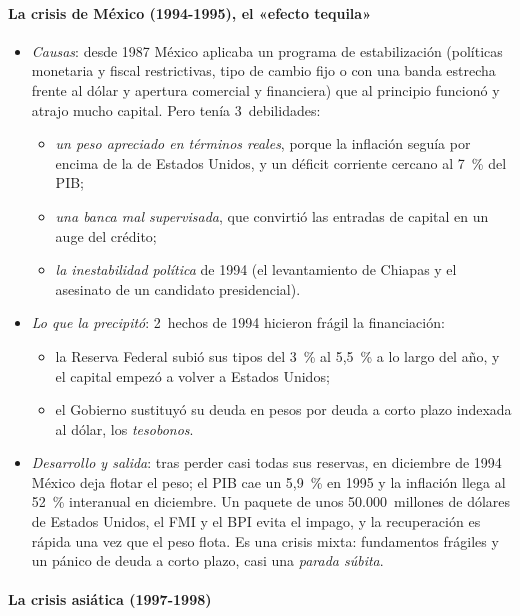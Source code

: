 \documentclass[11pt]{article}
\begin{document}
\paragraph{La crisis de México (1994-1995), el «efecto tequila»}

\begin{itemize}
\item \emph{Causas}: desde 1987 México aplicaba un programa de estabilización (políticas monetaria y fiscal restrictivas, tipo de cambio fijo o con una banda estrecha frente al dólar y apertura comercial y financiera) que al principio funcionó y atrajo mucho capital. Pero tenía 3~debilidades:
  \begin{itemize}
  \item \emph{un peso apreciado en términos reales}, porque la inflación seguía por encima de la de Estados Unidos, y un déficit corriente cercano al 7~\% del PIB;
  \item \emph{una banca mal supervisada}, que convirtió las entradas de capital en un auge del crédito;
  \item \emph{la inestabilidad política} de 1994 (el levantamiento de Chiapas y el asesinato de un candidato presidencial).
  \end{itemize}
\item \emph{Lo que la precipitó}: 2~hechos de 1994 hicieron frágil la financiación:
  \begin{itemize}
  \item la Reserva Federal subió sus tipos del 3~\% al 5,5~\% a lo largo del año, y el capital empezó a volver a Estados Unidos;
  \item el Gobierno sustituyó su deuda en pesos por deuda a corto plazo indexada al dólar, los \emph{tesobonos}.
  \end{itemize}
\item \emph{Desarrollo y salida}: tras perder casi todas sus reservas, en diciembre de 1994 México deja flotar el peso; el PIB cae un 5,9~\% en 1995 y la inflación llega al 52~\% interanual en diciembre. Un paquete de unos 50.000~millones de dólares de Estados Unidos, el FMI y el BPI evita el impago, y la recuperación es rápida una vez que el peso flota. Es una crisis mixta: fundamentos frágiles y un pánico de deuda a corto plazo, casi una \emph{parada súbita}\nocite{Calvo1998SuddenStops,FMI2026WEOdatos}.
\end{itemize}

\paragraph{La crisis asiática (1997-1998)}
\end{document}
